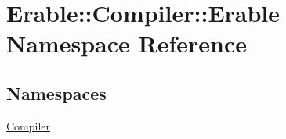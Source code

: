 \hypertarget{namespace_erable_1_1_compiler_1_1_erable}{}\section{Erable\+::Compiler\+::Erable Namespace Reference}
\label{namespace_erable_1_1_compiler_1_1_erable}
\subsection*{Namespaces}
\begin{DoxyCompactItemize}
\item 
 \mbox{\hyperlink{namespace_erable_1_1_compiler_1_1_erable_1_1_compiler}{Compiler}}
\end{DoxyCompactItemize}
